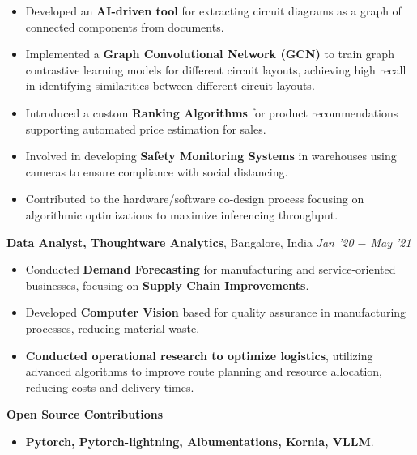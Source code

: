 \documentclass[10pt,a4]{article}
\begin{document}
{\begin{flushleft}
\begin{itemize}
        \item Developed an \textbf{AI-driven tool} for extracting circuit diagrams as a graph of connected components from documents.
        \item Implemented a \textbf{Graph Convolutional Network (GCN)} to train graph contrastive learning models for different circuit layouts, achieving high recall in identifying similarities between different circuit layouts.
        \item Introduced a custom \textbf{Ranking Algorithms} for product recommendations supporting automated price estimation for sales.
        \item Involved in developing \textbf{Safety Monitoring Systems} in warehouses using cameras to ensure compliance with social distancing.
        \item Contributed to the hardware/software co-design process focusing on algorithmic optimizations to maximize inferencing throughput.
    \end{itemize}		

    \vspace{0.5mm}
    \hspace{1.5mm} \textbf{\large Data Analyst, Thoughtware Analytics},  Bangalore, India \hfill \textit{\large Jan '20 $-$ May '21}	\\		
    \begin{itemize}
          
        \item Conducted \textbf{Demand Forecasting} for manufacturing and service-oriented businesses, focusing on \textbf{Supply Chain Improvements}.
        \item Developed \textbf{Computer Vision} based for quality assurance in manufacturing processes, reducing material waste.  
        \item \textbf{Conducted operational research to optimize logistics}, utilizing advanced algorithms to improve route planning and resource allocation, reducing costs and delivery times.
    \end{itemize}

    \vspace{1.0mm}
    \hspace{1.5mm} \textbf{\large Open Source Contributions}
    \begin{itemize}
        \item \textbf{Pytorch, Pytorch-lightning, Albumentations, Kornia, VLLM}.
    \end{itemize}
\end{flushleft}




}
\end{document}
